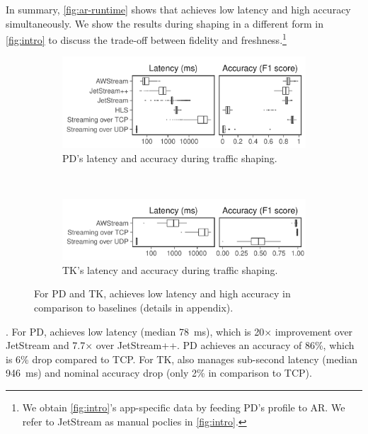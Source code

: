 In summary, \autoref{fig:ar-runtime} shows that \sysname{} achieves low latency
and high accuracy simultaneously. We show the results during shaping in a
different form in \autoref{fig:intro} to discuss the trade-off between fidelity
and freshness.\footnote{We obtain \autoref{fig:intro}'s app-specific data by
  feeding PD's profile to AR. We refer to JetStream as manual poclies in
  \autoref{fig:intro}.}

\begin{figure}[t]
  \begin{subfigure}[t]{\columnwidth}
    \centering
    \includegraphics[width=\columnwidth]{figures/runtime_mot-boxplot.pdf}
    \caption{PD's latency and accuracy during traffic shaping.}
    \label{fig:pd-runtime-boxplot}
  \end{subfigure}
  \\
  \begin{subfigure}[t]{\columnwidth}
    \centering
    \includegraphics[width=\columnwidth]{figures/runtime_tk-boxplot2.pdf}
    \caption[]{TK's latency and accuracy during traffic shaping.\footnotemark}
    \label{fig:tk-runtime-boxplot}
  \end{subfigure}
  \caption{For PD and TK, \sysname{} achieves low latency and high accuracy in
    comparison to baselines (details in appendix).}
  \label{fig:pd-tk}
\end{figure}


. For PD,
\sysname{} achieves low latency (median \SI{78}{ms}), which is 20$\times$
improvement over JetStream and 7.7$\times$ over JetStream++. PD achieves an
accuracy of 86\%, which is 6\% drop compared to TCP. For TK, \sysname{} also
manages sub-second latency (median \SI{946}{\ms}) and nominal accuracy drop
(only 2\% in comparison to TCP).

